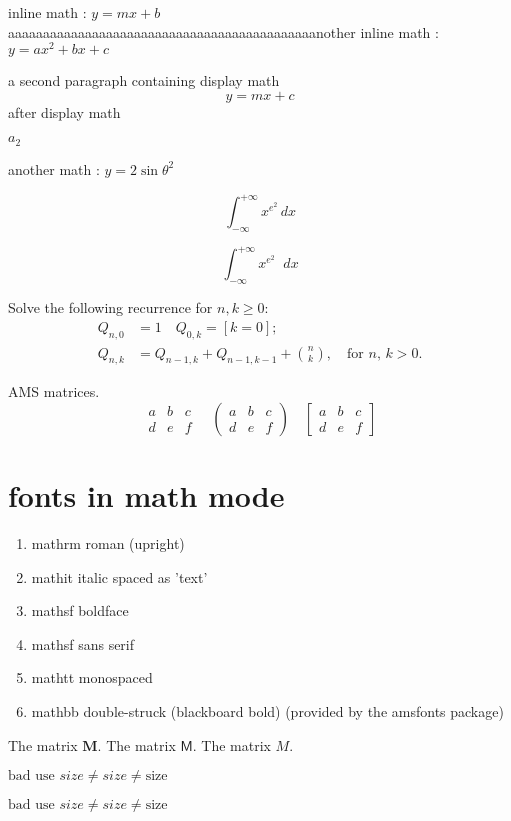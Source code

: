\documentclass{article}
\newcommand{\diff}{\mathop{}\!d}            %
\begin{document}
inline math : $y = mx + b$
aaaaaaaaaaaaaaaaaaaaaaaaaaaaaaaaaaaaaaaaaaaanother inline math : $y = ax^{2} + bx + c$


a second paragraph containing display math
\[
    y = mx + c
\]
after display math

\(
    a_{2}
\)


another math : $y = 2 \sin \theta^{2}$


\[
    \int_{-\infty}^{+\infty} x^{e^{2}} \, dx
\]


\[
    \int_{-\infty}^{+\infty} x^{e^{2}} \diff x
\]

Solve the following recurrence for $ n,k\geq 0 $:
\begin{align*}
  Q_{n,0} &= 1   \quad Q_{0,k} = [k=0];  \\
  Q_{n,k} &= Q_{n-1,k}+Q_{n-1,k-1}+\binom{n}{k}, \quad\text{for $n$, $k>0$.}
\end{align*}


AMS matrices.
\[
\begin{matrix}
a & b & c \\
d & e & f
\end{matrix}
\quad
\begin{pmatrix}
a & b & c \\
d & e & f
\end{pmatrix}
\quad
\begin{bmatrix}
a & b & c \\
d & e & f
\end{bmatrix}
\]


\section{fonts in math mode}
\begin{enumerate}
    \item mathrm roman (upright)
    \item mathit italic spaced as 'text'
    \item mathsf boldface 
    \item mathsf sans serif
    \item mathtt monospaced
    \item mathbb double-struck (blackboard bold) (provided by the amsfonts package)
\end{enumerate}    


The matrix $\mathbf{M}$.
The matrix $\mathsf{M}$.
The matrix $\mathit{M}$.

$\text{bad use } size  \neq \mathit{size} \neq \mathrm{size} $

\textit{$\text{bad use } size \neq \mathit{size} \neq \mathrm{size} $}
\end{document}
